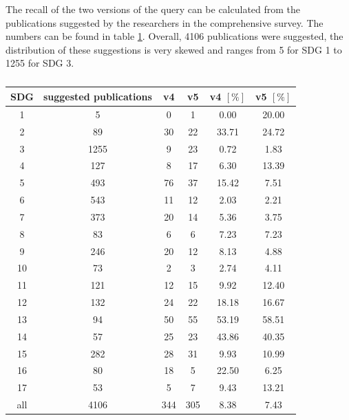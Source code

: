 \documentclass{article}
\begin{document}
The recall of the two versions of the query can be calculated from the publications suggested by the researchers in the comprehensive survey. The numbers can be found in table \ref{recalltable}. Overall, 4106 publications were suggested, the distribution of these suggestions is very skewed and ranges from 5 for SDG 1 to 1255 for SDG 3.
\begin{table}[H]
\centering 
 \begin{tabular}{cccccc}
 \toprule
  SDG & suggested publications & v4 & v5 & v4 $[\%]$ & v5 $[\%]$ \\
  \hline
 1 & 5 & 0 & 1 & 0.00 & 20.00 \\
 2 & 89 & 30 & 22 & 33.71 & 24.72 \\
 3 & 1255 & 9 & 23 & 0.72 & 1.83 \\
 4 & 127 & 8 & 17 & 6.30 & 13.39 \\
 5 & 493 & 76 & 37 & 15.42 & 7.51 \\
 6 & 543 & 11 & 12 & 2.03 & 2.21 \\
 7 & 373 & 20 & 14 & 5.36 & 3.75 \\
 8 & 83 & 6 & 6 & 7.23 & 7.23 \\
 9 & 246 & 20 & 12 & 8.13 & 4.88 \\
 10 & 73 & 2 & 3 & 2.74 & 4.11 \\
 11 & 121 & 12 & 15 & 9.92 & 12.40 \\
 12 & 132 & 24 & 22 & 18.18 & 16.67 \\
 13 & 94 & 50 & 55 & 53.19 & 58.51 \\
 14 & 57 & 25 & 23 & 43.86 & 40.35 \\
 15 & 282 & 28 & 31 & 9.93 & 10.99 \\
 16 & 80 & 18 & 5 & 22.50 & 6.25 \\
 17 & 53 & 5 & 7 & 9.43 & 13.21 \\
 all & 4106 & 344 & 305 & 8.38 & 7.43 \\
 \bottomrule
\end{tabular}
\caption{
}
\label{recalltable}
\end{table}
\end{document}
